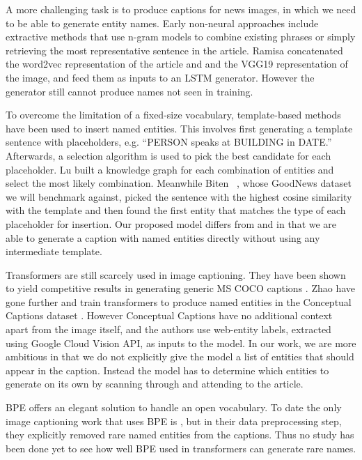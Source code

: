 \documentclass[10pt,twocolumn,letterpaper]{article}
\begin{document}
A more challenging task is to produce captions for news images, in which we
need to be able to generate entity names. Early non-neural approaches include
extractive methods that use n-gram models to combine existing phrases
\cite{Feng2013AutomaticCG} or simply retrieving the most representative
sentence \cite{Tariq2017ACE} in the article. Ramisa \etal
\cite{Ramisa2016BreakingNewsAA} concatenated the word2vec representation of the
article and and the VGG19 representation of the image, and feed them as inputs
to an LSTM generator. However the generator still cannot produce names not
seen in training.

To overcome the limitation of a fixed-size vocabulary, template-based methods
have been used to insert named entities. This involves first generating a
template sentence with placeholders, e.g. ``PERSON speaks at BUILDING in
DATE.'' Afterwards, a selection algorithm is used to pick the best candidate
for each placeholder. Lu \etal \cite{Lu2018EntityAI} built a knowledge graph
for each combination of entities and select the most likely combination.
Meanwhile Biten \etal~\cite{Biten2019GoodNews}, whose GoodNews dataset we will
benchmark against, picked the sentence with the highest cosine similarity with
the template and then found the first entity that matches the type of each
placeholder for insertion. Our proposed model differs from
\cite{Lu2018EntityAI} and \cite{Biten2019GoodNews} in that we are able to
generate a caption with named entities directly without using any intermediate
template.

Transformers are still scarcely used in image captioning. They have been shown
to yield competitive results in generating generic MS COCO captions
\cite{Zhu2018CaptioningTW, Li2019Boosted}. Zhao \etal
\cite{Zhao2019InformativeIC} have gone further and train transformers to
produce named entities in the Conceptual Captions dataset
\cite{Sharma2018ConceptualCA}. However Conceptual Captions have no additional
context apart from the image itself, and the authors use web-entity labels,
extracted using Google Cloud Vision API, as inputs to the model. In our work,
we are more ambitious in that we do not explicitly give the model a list of
entities that should appear in the caption. Instead the model has to determine
which entities to generate on its own by scanning through and attending to the
article.

BPE offers an elegant solution to handle an open vocabulary. To date the only
image captioning work that uses BPE is \cite{Sharma2018ConceptualCA}, but in
their data preprocessing step, they explicitly removed rare named entities from
the captions. Thus no study has been done yet to see how well BPE used in
transformers can generate rare names.
\end{document}

